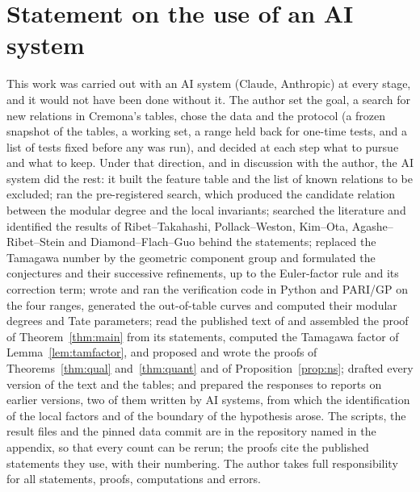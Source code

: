 \documentclass[11pt]{amsart}
\theoremstyle{definition}
\begin{document}
\section*{Statement on the use of an AI system}
This work was carried out with an AI system (Claude, Anthropic) at every stage, and it would not have been done without it. The author set the goal, a search for new relations in Cremona's tables, chose the data and the protocol (a frozen snapshot of the tables, a working set, a range held back for one-time tests, and a list of tests fixed before any was run), and decided at each step what to pursue and what to keep. Under that direction, and in discussion with the author, the AI system did the rest: it built the feature table and the list of known relations to be excluded; ran the pre-registered search, which produced the candidate relation between the modular degree and the local invariants; searched the literature and identified the results of Ribet--Takahashi, Pollack--Weston, Kim--Ota, Agashe--Ribet--Stein and Diamond--Flach--Guo behind the statements; replaced the Tamagawa number by the geometric component group and formulated the conjectures and their successive refinements, up to the Euler-factor rule and its correction term; wrote and ran the verification code in Python and PARI/GP on the four ranges, generated the out-of-table curves and computed their modular degrees and Tate parameters; read the published text of \cite{DFG04} and assembled the proof of Theorem~\ref{thm:main} from its statements, computed the Tamagawa factor of Lemma~\ref{lem:tamfactor}, and proposed and wrote the proofs of Theorems~\ref{thm:qual} and~\ref{thm:quant} and of Proposition~\ref{prop:ns}; drafted every version of the text and the tables; and prepared the responses to reports on earlier versions, two of them written by AI systems, from which the identification of the local factors and of the boundary of the hypothesis arose. The scripts, the result files and the pinned data commit are in the repository named in the appendix, so that every count can be rerun; the proofs cite the published statements they use, with their numbering. The author takes full responsibility for all statements, proofs, computations and errors.



\end{document}
